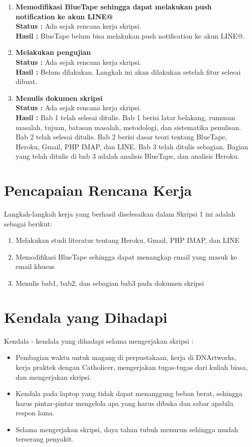 \documentclass[a4paper,twoside]{article}
\begin{document}
\begin{enumerate}
		
	\item \textbf{Memodifikasi BlueTape sehingga dapat melakukan push notification ke akun LINE@}\\
	{\bf Status :} Ada sejak rencana kerja skripsi.\\
	{\bf Hasil :} BlueTape belum bisa melakukan push notification ke akun LINE@.
		
	\item \textbf{Melakukan pengujian}\\
	{\bf Status :} Ada sejak rencana kerja skripsi.\\
	{\bf Hasil :} Belum dilakukan. Langkah ini akan dilakukan setelah fitur selesai dibuat. 
		
	\item \textbf{Menulis dokumen skripsi}\\
	{\bf Status :} Ada sejak rencana kerja skripsi.\\
	{\bf Hasil :} Bab 1 telah selesai ditulis. Bab 1 berisi latar belakang, rumusan masalah, tujuan, batasan masalah, metodologi, dan sistematika penulisan. Bab 2 telah selesai ditulis. Bab 2 berisi dasar teori tentang BlueTape, Heroku, Gmail, PHP IMAP, dan LINE. Bab 3 telah ditulis sebagian. Bagian yang telah ditulis di bab 3 adalah analisis BlueTape, dan analisis Heroku.
\end{enumerate}

\section{Pencapaian Rencana Kerja}
Langkah-langkah kerja yang berhasil diselesaikan dalam Skripsi 1 ini adalah sebagai berikut:
\begin{enumerate}
\item Melakukan studi literatur tentang Heroku, Gmail, PHP IMAP, dan LINE
\item Memodifikasi BlueTape sehingga dapat menangkap email yang masuk ke email khusus
\item Menulis bab1, bab2, dan sebagian bab3 pada dokumen skripsi
\end{enumerate}


\section{Kendala yang Dihadapi}
Kendala - kendala yang dihadapi selama mengerjakan skripsi :
\begin{itemize}
	\item Pembagian waktu untuk magang di perpustakaan, kerja di DNArtworks, kerja praktek dengan Catholicer, mengerjakan tugas-tugas dari kuliah biasa, dan mengerjakan skripsi.
	\item Kendala pada laptop yang tidak dapat menanggung beban berat, sehingga harus pintar-pintar mengelola apa yang harus dibuka dan sabar apabila respon lama.
	\item Selama mengerjakan skripsi, daya tahan tubuh menurun sehingga mudah terserang penyakit.
\end{itemize}
\end{document}
